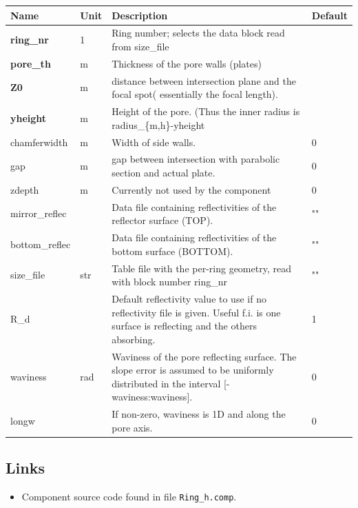 \begin{longtable}{p{}p{}p{}p{}}
\toprule
\textbf{Name} & \textbf{Unit} & \textbf{Description} & \textbf{Default} \\
\midrule
\endhead
\textbf{ring\_nr} & 1 & Ring number; selects the data block read from size\_file &  \\
\textbf{pore\_th} & m & Thickness of the pore walls (plates) &  \\
\textbf{Z0} & m & distance between intersection plane and the focal spot( essentially the focal length). &  \\
\textbf{yheight} & m & Height of the pore. (Thus the inner radius is radius\_\{m,h\}-yheight &  \\
chamferwidth & m & Width of side walls. & 0 \\
gap & m & gap between intersection with parabolic section and actual plate. & 0 \\
zdepth & m & Currently not used by the component & 0 \\
mirror\_reflec &   & Data file containing reflectivities of the reflector surface (TOP). & "" \\
bottom\_reflec &   & Data file containing reflectivities of the bottom surface (BOTTOM). & "" \\
size\_file & str & Table file with the per-ring geometry, read with block number ring\_nr & "" \\
R\_d &   & Default reflectivity value to use if no reflectivity file is given. Useful f.i. is one surface is reflecting and the others absorbing. & 1 \\
waviness & rad & Waviness of the pore reflecting surface. The slope error is assumed to be uniformly distributed in the interval [-waviness:waviness]. & 0 \\
longw &   & If non-zero, waviness is 1D and along the pore axis. & 0 \\
\bottomrule
\end{longtable}

\subsection*{Links}
\begin{itemize}
  \item Component source code found in file \texttt{Ring\_h.comp}.
\end{itemize}
